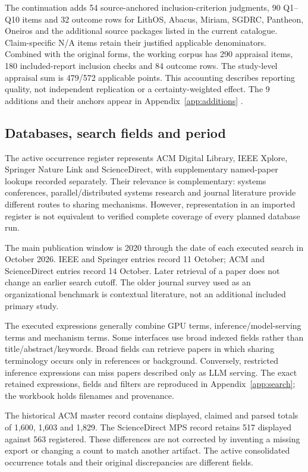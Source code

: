 The continuation adds 54 source-anchored inclusion-criterion judgments, 90 Q1--Q10 items and 32 outcome rows for LithOS, Abacus, Miriam, SGDRC, Pantheon, Oneiros and the additional source packages listed in the current catalogue. Claim-specific N/A items retain their justified applicable denominators. Combined with the original forms, the working corpus has 290 appraisal items, 180 included-report inclusion checks and 84 outcome rows. The study-level appraisal sum is 479/572 applicable points. This accounting describes reporting quality, not independent replication or a certainty-weighted effect. The 9 additions and their anchors appear in Appendix~\ref{app:additions} \cite{s021,s022,s023,s024,s025,s026}.

\subsection{Databases, search fields and period}
The active occurrence register represents ACM Digital Library, IEEE Xplore, Springer Nature Link and ScienceDirect, with supplementary named-paper lookups recorded separately. Their relevance is complementary: systems conferences, parallel/distributed systems research and journal literature provide different routes to sharing mechanisms. However, representation in an imported register is not equivalent to verified complete coverage of every planned database run.

The main publication window is 2020 through the date of each executed search in October 2026. IEEE and Springer entries record 11 October; ACM and ScienceDirect entries record 14 October. Later retrieval of a paper does not change an earlier search cutoff. The older journal survey used as an organizational benchmark is contextual literature, not an additional included primary study.

The executed expressions generally combine GPU terms, inference/model-serving terms and mechanism terms. Some interfaces use broad indexed fields rather than title/abstract/keywords. Broad fields can retrieve papers in which sharing terminology occurs only in references or background. Conversely, restricted inference expressions can miss papers described only as LLM serving. The exact retained expressions, fields and filters are reproduced in Appendix~\ref{app:search}; the workbook holds filenames and provenance.

The historical ACM master record contains displayed, claimed and parsed totals of 1,600, 1,603 and 1,829. The ScienceDirect MPS record retains 517 displayed against 563 registered. These differences are not corrected by inventing a missing export or changing a count to match another artifact. The active consolidated occurrence totals and their original discrepancies are different fields.

